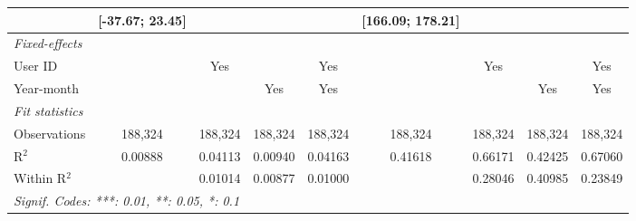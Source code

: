 \begin{table}[htbp]
\begin{threeparttable}[b]
\begin{tabular}{lcccccccc}
                         & [-37.67; 23.45] &                &                 &                 & [166.09; 178.21] &                &                 &   \\   
         \midrule
         \emph{Fixed-effects}\\
         User ID         &                 & Yes            &                 & Yes             &                  & Yes            &                 & Yes\\  
         Year-month      &                 &                & Yes             & Yes             &                  &                & Yes             & Yes\\  
         \midrule
         \emph{Fit statistics}\\
         Observations    & 188,324         & 188,324        & 188,324         & 188,324         & 188,324          & 188,324        & 188,324         & 188,324\\  
         R$^2$           & 0.00888         & 0.04113        & 0.00940         & 0.04163         & 0.41618          & 0.66171        & 0.42425         & 0.67060\\  
         Within R$^2$    &                 & 0.01014        & 0.00877         & 0.01000         &                  & 0.28046        & 0.40985         & 0.23849\\  
         \midrule \midrule
         \multicolumn{9}{l}{\emph{Signif. Codes: ***: 0.01, **: 0.05, *: 0.1}}\\
      \end{tabular}
   \end{threeparttable}
\end{table}


